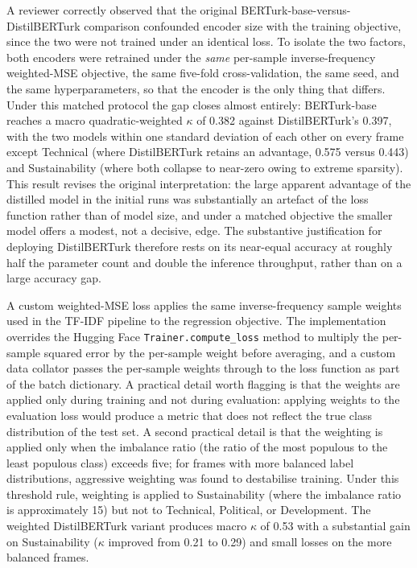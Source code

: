 \documentclass[12pt, journal]{IEEEtran}
\begin{document}
A reviewer correctly observed that the original BERTurk-base-versus-DistilBERTurk comparison confounded encoder size with the training objective, since the two were not trained under an identical loss. To isolate the two factors, both encoders were retrained under the \emph{same} per-sample inverse-frequency weighted-MSE objective, the same five-fold cross-validation, the same seed, and the same hyperparameters, so that the encoder is the only thing that differs. Under this matched protocol the gap closes almost entirely: BERTurk-base reaches a macro quadratic-weighted $\kappa$ of 0.382 against DistilBERTurk's 0.397, with the two models within one standard deviation of each other on every frame except Technical (where DistilBERTurk retains an advantage, 0.575 versus 0.443) and Sustainability (where both collapse to near-zero owing to extreme sparsity). This result revises the original interpretation: the large apparent advantage of the distilled model in the initial runs was substantially an artefact of the loss function rather than of model size, and under a matched objective the smaller model offers a modest, not a decisive, edge. The substantive justification for deploying DistilBERTurk therefore rests on its near-equal accuracy at roughly half the parameter count and double the inference throughput, rather than on a large accuracy gap.

A custom weighted-MSE loss applies the same inverse-frequency sample weights used in the TF-IDF pipeline to the regression objective. The implementation overrides the Hugging Face \texttt{Trainer.compute\_loss} method to multiply the per-sample squared error by the per-sample weight before averaging, and a custom data collator passes the per-sample weights through to the loss function as part of the batch dictionary. A practical detail worth flagging is that the weights are applied only during training and not during evaluation: applying weights to the evaluation loss would produce a metric that does not reflect the true class distribution of the test set. A second practical detail is that the weighting is applied only when the imbalance ratio (the ratio of the most populous to the least populous class) exceeds five; for frames with more balanced label distributions, aggressive weighting was found to destabilise training. Under this threshold rule, weighting is applied to Sustainability (where the imbalance ratio is approximately 15) but not to Technical, Political, or Development. The weighted DistilBERTurk variant produces macro $\kappa$ of 0.53 with a substantial gain on Sustainability ($\kappa$ improved from 0.21 to 0.29) and small losses on the more balanced frames.
\end{document}
